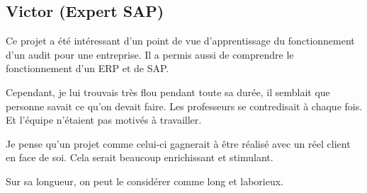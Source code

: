 \subsection{Victor  (Expert SAP)}

Ce projet a été intéressant d’un point de vue d’apprentissage du fonctionnement 
d’un audit pour une entreprise. Il a permis aussi de comprendre le fonctionnement
d'un ERP et de SAP.

Cependant, je lui trouvais très flou pendant toute sa durée, il semblait que 
personne savait ce qu'on devait faire. Les professeurs se contredisait à
chaque fois. Et l'équipe n'étaient pas motivés à travailler.

Je pense qu’un projet comme celui-ci gagnerait à être réalisé avec un 
réel client en face de soi. Cela serait beaucoup enrichissant et stimulant. 

Sur sa longueur, on peut le considérer comme long et laborieux.

